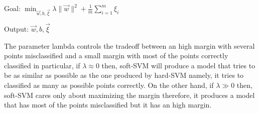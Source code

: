 \documentclass[a4paper,11pt,oneside]{book}
\begin{document}
\begin{enumerate}
\begin{solution}
        Goal: $\min_{\vec{w},b,\vec{\xi}} \lambda\|\vec{w}\|^2 + \frac{1}{m}\sum_{i=1}^m \xi_i$
        
        Output: $\vec{w}, b, \vec{\xi}$
        
        The parameter lambda controls the tradeoff between an high margin with several points misclassified and a small margin with most of the points correctly classified in particular, if $\lambda \approx 0$ then, soft-SVM will produce a model that tries to be as similar as possible as the one produced by hard-SVM namely, it tries to classified as many as possible points correctly. On the other hand, if $\lambda \gg 0$ then, soft-SVM cares only about maximizing the margin therefore, it produces a model that has most of the points misclassified but it has an high margin.
    \end{solution}
\end{enumerate}
\end{document}
